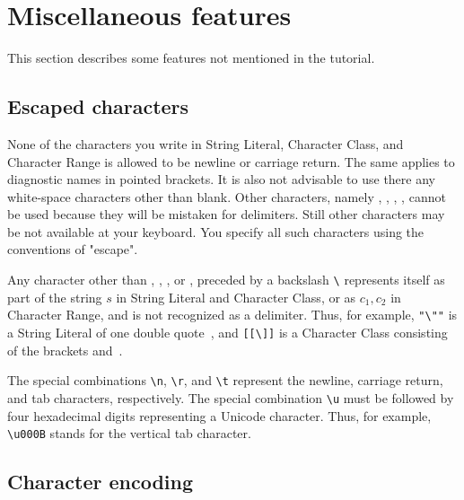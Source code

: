 
\section{Miscellaneous features}


This section describes some features not mentioned in the tutorial.

\subsection{Escaped characters\label{escape}}

None of the characters you write in String Literal, Character Class, and Character Range
is allowed to be newline or carriage return.
The same applies to diagnostic names in pointed brackets.
It is also not advisable to use there any white-space characters other than blank.
Other characters, namely , \tx{]}, \tx{-}, \tx{>}, cannot be used because they will be mistaken
for delimiters. 
Still other characters may be not available at your keyboard.
You specify all such characters using the conventions of "escape". 

Any character other than , , , or ,
preceded by a backslash \verb#\# represents itself as part of the string $s$
in String Literal and Character Class,
or as $c_1, c_2$ in Character Range, and is not recognized as a delimiter.
Thus, for example, \verb#"\""# is a String Literal of one double quote~,
and \verb#[[\]]# is a Character Class consisting of the brackets \tx{[} and~\tx{]}.

The special combinations \verb#\n#, \verb#\r#, and \verb#\t# represent
the newline, carriage return, and tab characters, respectively.
The special combination \verb#\u# must be followed by four hexadecimal digits
representing a Unicode character. 
Thus, for example, \verb#\u000B# stands for the vertical tab character.

\subsection{Character encoding}

